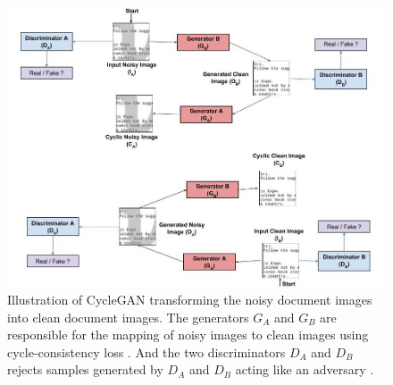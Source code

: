 \begin{figure}[H]
        \begin{center}
 	    \includegraphics[scale=0.60]{images/LearningToClean.jpg}
	    \caption[Illustration of \ac{CycleGAN} transforming the noisy document images into clean document images. and vice versa.]{Illustration of CycleGAN transforming the noisy document images into clean document images. The generators $G_A$ and $G_B$ are responsible for the mapping of noisy images to clean images using cycle-consistency loss \cite{zhu2020unpaired}. And the two discriminators $D_A$ and $D_B$ rejects samples generated by $D_A$ and $D_B$ acting like an adversary \cite{sharma2019learning}.}
	    \label{fig:LearningToClean}
	    \end{center}
\end{figure}



